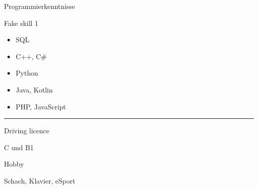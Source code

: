 \documentclass[a4paper,10pt]{article}
\newlength{\cvcolumngapwidth}
\newlength{\cvleftcolumnwidth}
\newlength{\cvrightcolumnwidth}
\newcommand{\cvsectionstyle}[1]{{\normalsize\cvsectionfont\textcolor{cvsectioncolor}{#1}}}
\newcommand{\cvheadingstyle}[1]{{\normalsize\cvheadingfont\textcolor{cvheadingcolor}{#1}}}
\newlength{\cvafteritemskipamount}
\newlength{\cvaftersectionskipamount}
\newlength{\cvbetweensectionandheadingextraskipamount}
\newlength{\cvparskip}
\newcommand{\cvsection}[1]{
    \begin{minipage}[t]{\cvleftcolumnwidth}
        \raggedleft\cvsectionstyle{#1}
    \end{minipage}%
    \hspace{\cvcolumngapwidth}%
    \begin{minipage}[t]{\cvrightcolumnwidth}
        \textcolor{cvrulecolor}{\rule{\cvrightcolumnwidth}{0.3mm}}
    \end{minipage}

    \vspace{\cvaftersectionskipamount}
}
\newcommand{\cvitem}[2]{
    \begin{minipage}[t]{\cvleftcolumnwidth}
        \raggedleft #1
    \end{minipage}%
    \hspace{\cvcolumngapwidth}%
    \begin{minipage}[t]{\cvrightcolumnwidth}
        \setlength{\parskip}{\cvparskip} #2
    \end{minipage}

    \vspace{\cvafteritemskipamount}
}
\begin{document}
\cvitem{
    \cvheadingstyle{Programmierkenntnisse}
}{
    Fake skill 1
    \begin{itemize}
        \item SQL 
        \item C++, C#
        \item Python 
        \item Java, Kotlin
        \item PHP, JavaScript
    \end{itemize}
}




\cvsection{Persöhnliche Informationen}

\vspace{\cvbetweensectionandheadingextraskipamount}

\cvitem{
    \cvheadingstyle{Driving licence}
}{
    C und B1
}

\cvitem{
    \cvheadingstyle{Hobby}
}{
    Schach, Klavier, eSport
}
\end{document}
